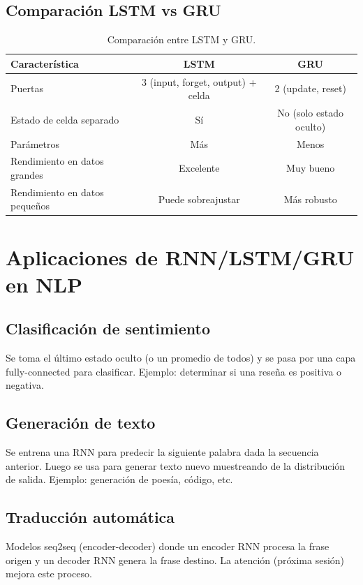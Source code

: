 \documentclass[12pt,a4paper,openany,oneside]{book}
\begin{document}
\subsection{Comparación LSTM vs GRU}
\begin{table}[h]
\centering
\begin{tabular}{|l|c|c|}
\hline
\textbf{Característica} & \textbf{LSTM} & \textbf{GRU} \\
\hline
Puertas & 3 (input, forget, output) + celda & 2 (update, reset) \\
Estado de celda separado & Sí & No (solo estado oculto) \\
Parámetros & Más & Menos \\
Rendimiento en datos grandes & Excelente & Muy bueno \\
Rendimiento en datos pequeños & Puede sobreajustar & Más robusto \\
\hline
\end{tabular}
\caption{Comparación entre LSTM y GRU.}
\end{table}

\section{Aplicaciones de RNN/LSTM/GRU en NLP}

\subsection{Clasificación de sentimiento}
Se toma el último estado oculto (o un promedio de todos) y se pasa por una capa fully-connected para clasificar. Ejemplo: determinar si una reseña es positiva o negativa.

\subsection{Generación de texto}
Se entrena una RNN para predecir la siguiente palabra dada la secuencia anterior. Luego se usa para generar texto nuevo muestreando de la distribución de salida. Ejemplo: generación de poesía, código, etc.

\subsection{Traducción automática}
Modelos seq2seq (encoder-decoder) donde un encoder RNN procesa la frase origen y un decoder RNN genera la frase destino. La atención (próxima sesión) mejora este proceso.
\end{document}
